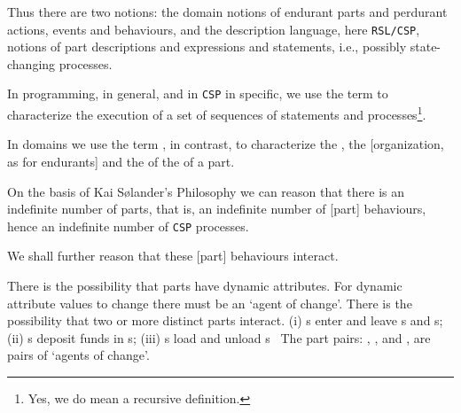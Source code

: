 \mnewfoil

\begynd
\pind Thus there are two notions:
\begynd
\pind the domain notions of endurant parts and perdurant actions,
      events and behaviours, and
\pind the description language, here \texttt{RSL/CSP}, notions of
      part descriptions and expressions and statements, i.e., possibly
      state-changing processes.
\afslut
\afslut

\label{An Aside: Behaviours versus Processes}
\begynd
\pind In programming, in general, and in \texttt{CSP} in specific, we use the term  
\begynd
\pind to characterize the execution of 
\pind a set of sequences of
\pind {[program]} statements 
\pind and processes\footnote{Yes, we do mean a recursive definition.}.
\afslut
\afslut


\mnewfoil


\mnewfoil

\noindent
\begynd
\pind In domains we use the term , in contrast,
\begynd
\pind to characterize the ,
\pind the [organization, as for endurants] 
\pind and the 
\pind of the  of a part.
\afslut
\afslut

\bnew

\begynd
\pind On the basis of Kai S{\o}lander's Philosophy
      \cite{kaisorlander1994,kaisorlander1997,kaisorlander2002,kaisorlander2016,kaisorlander2022}
      we can reason that there  
\begynd
\pind is an indefinite number of parts, 
\pind that is, an indefinite number of [part] behaviours,
\pind hence an indefinite number of \texttt{CSP} processes.
\afslut

\pind We shall further reason that these [part] behaviours interact.

\begynd
\pind There is the possibility that parts have dynamic attributes. 
\pind For dynamic attribute values to change there must be an `agent of change'.
\pind There is the possibility that two or more distinct parts
      interact.
\pind {}
\begynd
\pind (i) s enter and leave s and s;
\pind (ii) s deposit funds in s;
\pind (iii) s load and unload s\dbsquare\
\afslut
\pind The part pairs: 
\begynd
\pind {},
\pind {}, 
\pind {} and   
\pind{}, 
\afslut are pairs of `agents of change'.
\afslut

